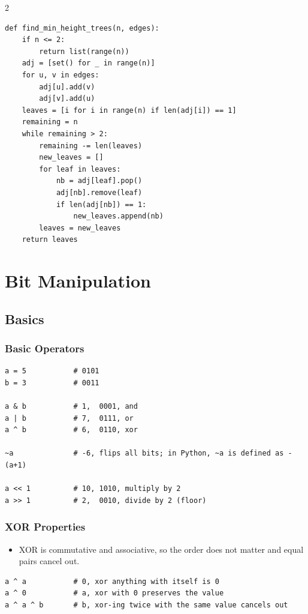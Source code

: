\documentclass[9pt,a4paper]{extarticle}
\newlength{\tw}
\begin{document}
\begin{multicols}{2}
\begin{lstlisting}
def find_min_height_trees(n, edges):
    if n <= 2:
        return list(range(n))
    adj = [set() for _ in range(n)]
    for u, v in edges:
        adj[u].add(v)
        adj[v].add(u)
    leaves = [i for i in range(n) if len(adj[i]) == 1]
    remaining = n
    while remaining > 2:
        remaining -= len(leaves)
        new_leaves = []
        for leaf in leaves:
            nb = adj[leaf].pop()
            adj[nb].remove(leaf)
            if len(adj[nb]) == 1:
                new_leaves.append(nb)
        leaves = new_leaves
    return leaves
\end{lstlisting}

\section{Bit Manipulation}

\subsection{Basics}

\subsubsection{Basic Operators}

\begin{lstlisting}
a = 5           # 0101
b = 3           # 0011

a & b           # 1,  0001, and
a | b           # 7,  0111, or
a ^ b           # 6,  0110, xor

~a              # -6, flips all bits; in Python, ~a is defined as -(a+1)

a << 1          # 10, 1010, multiply by 2
a >> 1          # 2,  0010, divide by 2 (floor)
\end{lstlisting}

\subsubsection{XOR Properties}

\begin{itemize}
\item XOR is commutative and associative, so the order does not matter and equal pairs cancel out.
\end{itemize}

\begin{lstlisting}
a ^ a           # 0, xor anything with itself is 0
a ^ 0           # a, xor with 0 preserves the value
a ^ a ^ b       # b, xor-ing twice with the same value cancels out
\end{lstlisting}


\end{multicols}
\end{document}

